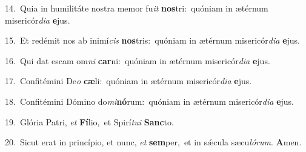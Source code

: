 {\numbfont\textcolor{\numbcolor}{14.}}~Quia in humilitáte nostra memor fu\textit{it} \textbf{nos}\-tri:~\star quóniam in ætérnum misericór\-\textit{di}\-\textit{a} \textbf{e}\-jus.\par
{\numbfont\textcolor{\numbcolor}{15.}}~Et redémit nos ab inimí\textit{cis} \textbf{nos}\-tris:~\star quóniam in ætérnum misericór\-\textit{di}\-\textit{a} \textbf{e}\-jus.\par
{\numbfont\textcolor{\numbcolor}{16.}}~Qui dat escam om\textit{ni} \textbf{car}\-ni:~\star quóniam in ætérnum misericór\-\textit{di}\-\textit{a} \textbf{e}\-jus.\par
{\numbfont\textcolor{\numbcolor}{17.}}~Confitémini De\textit{o} \textbf{cæ}\-li:~\star quóniam in ætérnum misericór\-\textit{di}\-\textit{a} \textbf{e}\-jus.\par
{\numbfont\textcolor{\numbcolor}{18.}}~Confitémini Dómino do\-\textit{mi}\-\textbf{nó}rum:~\star quóniam in ætérnum misericór\-\textit{di}\-\textit{a} \textbf{e}\-jus.\par
{\numbfont\textcolor{\numbcolor}{19.}}~Glória Patri, \textit{et} \textbf{Fí}\-lio,~\star et Spirí\-\textit{tu}\-\textit{i} \textbf{Sanc}\-to.\par
{\numbfont\textcolor{\numbcolor}{20.}}~Sicut erat in princípio, et nunc, \textit{et} \textbf{sem}\-per,~\star et in sǽcula sæcu\-\textit{ló}\-\textit{rum}. \textbf{A}\-men.\par
